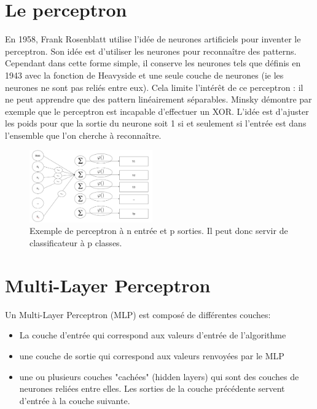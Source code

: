 \section{Le perceptron}
En 1958, Frank Rosenblatt utilise l'idée de neurones artificiels pour inventer le perceptron\cite{}. Son idée est d'utiliser les neurones pour reconnaître des patterns. Cependant dans cette forme simple, il conserve les neurones tels que définis en 1943 avec la fonction de Heavyside et une seule couche de neurones (ie les neurones ne sont pas reliés entre eux). Cela limite l'intérêt de ce perceptron : il ne peut apprendre que des pattern linéairement séparables. Minsky\cite{MINSKY} démontre par exemple que le perceptron est incapable d'effectuer un XOR.
L'idée est d'ajuster les poids pour que la sortie du neurone soit 1 si et seulement si l'entrée est dans l'ensemble que l'on cherche à reconnaître. 

\begin{figure}[!h]
\centering
\includegraphics[width=150pt,valign=t]{"images/MLP/perceptron"}
\caption{Exemple de perceptron à n entrée et p sorties. Il peut donc servir de classificateur à p classes.}
\label{perceptron}
\end{figure}

\section{Multi-Layer Perceptron}
Un Multi-Layer Perceptron (MLP) est composé de différentes couches: \begin{itemize}
\item La couche d'entrée qui correspond aux valeurs d'entrée de l'algorithme
\item une couche de sortie qui correspond aux valeurs renvoyées par le MLP
\item une ou plusieurs couches "cachées" (hidden layers) qui sont des couches de neurones reliées entre elles. Les sorties de la couche précédente servent d'entrée à la couche suivante.

\end{itemize}

